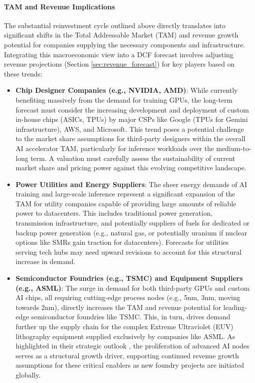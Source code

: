 \paragraph{TAM and Revenue Implications} \label{par:ai_tam_revenue}
The substantial reinvestment cycle outlined above directly translates into significant shifts in the Total Addressable Market (TAM) and revenue growth potential for companies supplying the necessary components and infrastructure. Integrating this macroeconomic view into a DCF forecast involves adjusting revenue projections (Section \ref{sec:revenue_forecast}) for key players based on these trends:

\begin{itemize}
    \item \textbf{Chip Designer Companies (e.g., NVIDIA, AMD)}: While currently benefiting massively from the demand for training GPUs, the long-term forecast must consider the increasing development and deployment of custom in-house chips (ASICs, TPUs) by major CSPs like Google (TPUs for Gemini infrastructure), AWS, and Microsoft. This trend poses a potential challenge to the market share assumptions for third-party designers within the overall AI accelerator TAM, particularly for inference workloads over the medium-to-long term. A valuation must carefully assess the sustainability of current market share and pricing power against this evolving competitive landscape.
    \item \textbf{Power Utilities and Energy Suppliers}: The sheer energy demands of AI training and large-scale inference represent a significant expansion of the TAM for utility companies capable of providing large amounts of reliable power to datacenters. This includes traditional power generation, transmission infrastructure, and potentially suppliers of fuels for dedicated or backup power generation (e.g., natural gas, or potentially uranium if nuclear options like SMRs gain traction for datacenters). Forecasts for utilities serving tech hubs may need upward revisions to account for this structural increase in demand.
    \item \textbf{Semiconductor Foundries (e.g., TSMC) and Equipment Suppliers (e.g., ASML)}: The surge in demand for both third-party GPUs and custom AI chips, all requiring cutting-edge process nodes (e.g., 5nm, 3nm, moving towards 2nm), directly increases the TAM and revenue potential for leading-edge semiconductor foundries like TSMC. This, in turn, drives demand further up the supply chain for the complex Extreme Ultraviolet (EUV) lithography equipment supplied exclusively by companies like ASML. As highlighted in their strategic outlook \parencite{asml2024annual}, the proliferation of advanced AI nodes serves as a structural growth driver, supporting continued revenue growth assumptions for these critical enablers as new foundry projects are initiated globally.

\end{itemize}
